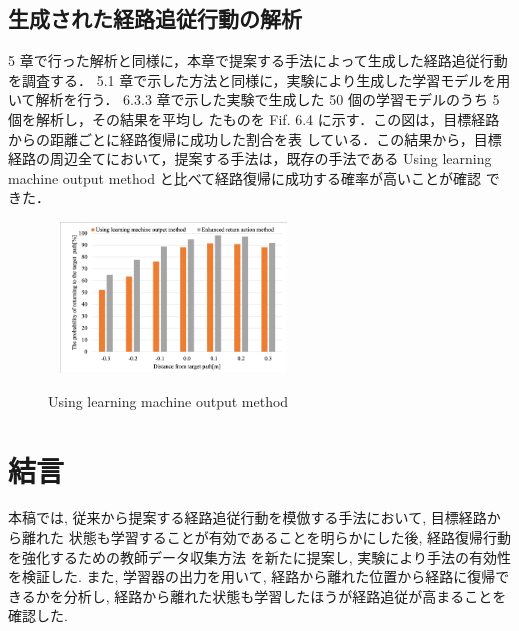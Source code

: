 \documentclass{jarticle}
\begin{document}
\subsection{生成された経路追従行動の解析}
5 章で行った解析と同様に，本章で提案する手法によって生成した経路追従行動を調査する．
5.1 章で示した方法と同様に，実験により生成した学習モデルを用いて解析を行う．
6.3.3 章で示した実験で生成した 50 個の学習モデルのうち 5 個を解析し，その結果を平均し
たものを Fif. 6.4 に示す．この図は，目標経路からの距離ごとに経路復帰に成功した割合を表
している．この結果から，目標経路の周辺全てにおいて，提案する手法は，既存の手法である
Using learning machine output method と比べて経路復帰に成功する確率が高いことが確認
できた．

\begin{figure}[h!]\
  \centering
   \includegraphics[height=40mm]{./figs/last.png}
   \caption{Using learning machine output method}
\end{figure}


\section{結言}
本稿では, 従来から提案する経路追従行動を模倣する手法において, 目標経路から離れた
状態も学習することが有効であることを明らかにした後, 経路復帰行動を強化するための教師データ収集方法
を新たに提案し, 実験により手法の有効性を検証した.
また, 学習器の出力を用いて, 経路から離れた位置から経路に復帰できるかを分析し, 経路から離れた状態も学習したほうが経路追従が高まることを確認した.
\end{document}
